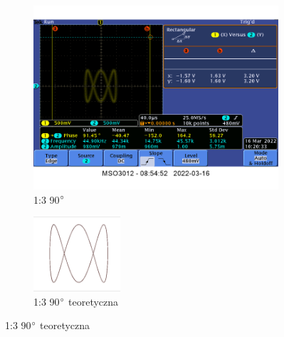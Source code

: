 {    \begin{figure}[H]
        \centering
        \begin{subfigure}[h]{0.45\textwidth}
            \includegraphics[scale=0.3]{images/1_5_1-3-90.png}
            \caption*{1:3 90$\degree$}
        \end{subfigure}
        \begin{subfigure}[h]{0.45\textwidth}
            \includegraphics[scale=1.9]{images/theoretical/1-3-90.png}
            \caption*{1:3 90$\degree$ teoretyczna}
        \end{subfigure}
    \end{figure}
}

